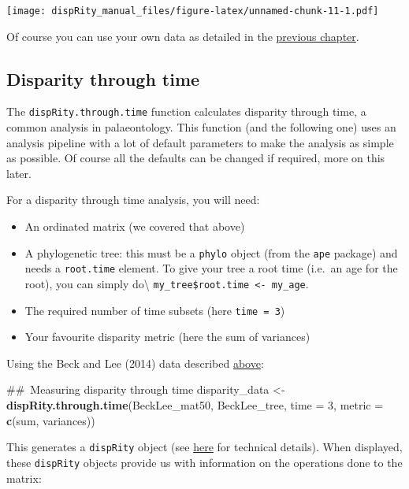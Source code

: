 \documentclass[]{book}
\newenvironment{Shaded}{\begin{snugshade}}{\end{snugshade}}
\newcommand{\KeywordTok}[1]{\textcolor[rgb]{0.13,0.29,0.53}{\textbf{#1}}}
\newcommand{\DataTypeTok}[1]{\textcolor[rgb]{0.13,0.29,0.53}{#1}}
\newcommand{\DecValTok}[1]{\textcolor[rgb]{0.00,0.00,0.81}{#1}}
\newcommand{\StringTok}[1]{\textcolor[rgb]{0.31,0.60,0.02}{#1}}
\newcommand{\NormalTok}[1]{#1}
\providecommand{\tightlist}{%
  \setlength{\itemsep}{0pt}\setlength{\parskip}{0pt}}
\theoremstyle{definition}
\theoremstyle{definition}
\theoremstyle{remark}
\begin{document}
\texttt{[image: dispRity\_manual\_files/figure-latex/unnamed-chunk-11-1.pdf]}

Of course you can use your own data as detailed in the
\protect\hyperlink{What-sort-of-data-does-dispRity-work-with}{previous
chapter}.

\subsection{Disparity through time}\label{disparity-through-time}

The \texttt{dispRity.through.time} function calculates disparity through
time, a common analysis in palaeontology. This function (and the
following one) uses an analysis pipeline with a lot of default
parameters to make the analysis as simple as possible. Of course all the
defaults can be changed if required, more on this later.

For a disparity through time analysis, you will need:

\begin{itemize}
\tightlist
\item
  An ordinated matrix (we covered that above)
\item
  A phylogenetic tree: this must be a \texttt{phylo} object (from the
  \texttt{ape} package) and needs a \texttt{root.time} element. To give
  your tree a root time (i.e.~an age for the root), you can simply
  do\textbackslash{}
  \texttt{my\_tree\$root.time\ \textless{}-\ my\_age}.
\item
  The required number of time subsets (here \texttt{time\ =\ 3})
\item
  Your favourite disparity metric (here the sum of variances)
\end{itemize}

Using the Beck and Lee (2014) data described
\protect\hyperlink{example-data}{above}:

\begin{Shaded}
\begin{Highlighting}[]
\NormalTok{## Measuring disparity through time}
\NormalTok{disparity_data <-}\StringTok{ }\KeywordTok{dispRity.through.time}\NormalTok{(BeckLee_mat50, BeckLee_tree,}
                                        \DataTypeTok{time =} \DecValTok{3}\NormalTok{, }\DataTypeTok{metric =} \KeywordTok{c}\NormalTok{(sum, variances))}
\end{Highlighting}
\end{Shaded}

This generates a \texttt{dispRity} object (see
\protect\hyperlink{guts}{here} for technical details). When displayed,
these \texttt{dispRity} objects provide us with information on the
operations done to the matrix:
\end{document}

